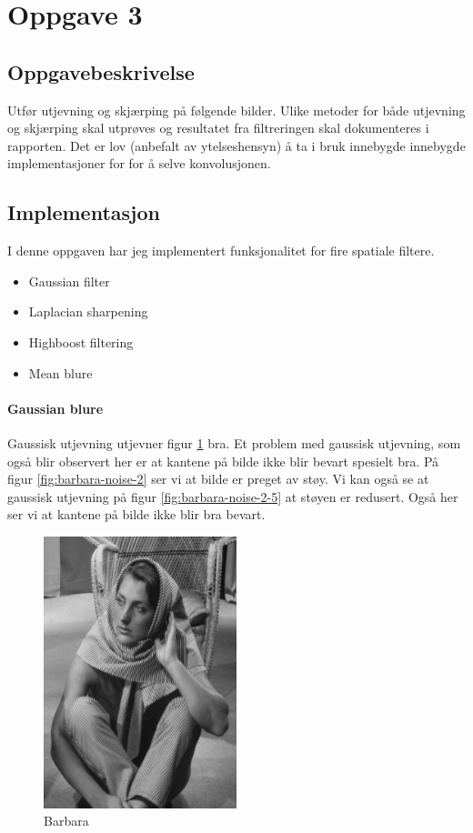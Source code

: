 \documentclass[a4paper, 12pt]{article}
\begin{document}
\section{Oppgave 3}
\subsection{Oppgavebeskrivelse}
Utfør utjevning og skjærping på følgende bilder. Ulike metoder for både utjevning og skjærping skal utprøves og resultatet fra filtreringen skal dokumenteres i rapporten. Det er lov (anbefalt av ytelseshensyn) å ta i bruk innebygde innebygde implementasjoner for for å selve konvolusjonen.

\subsection{Implementasjon}
I denne oppgaven har jeg implementert funksjonalitet for fire spatiale filtere.
\begin{itemize}
\item Gaussian filter
\item Laplacian sharpening
\item Highboost filtering
\item Mean blure
\end{itemize}

\paragraph{Gaussian blure}
Gaussisk utjevning utjevner figur \ref{fig:barbara} bra. Et problem med gaussisk utjevning, som også blir observert her er at kantene på bilde ikke blir bevart spesielt bra.
På figur \ref{fig:barbara-noise-2} ser vi at bilde er preget av støy. Vi kan også se at gaussisk utjevning på figur \ref{fig:barbara-noise-2-5} at støyen er redusert. Også her ser vi at kantene på bilde ikke blir bra bevart.
\begin{figure}[h]
  \centering
  \includegraphics[width=0.5\textwidth]{images/barbara}
  \caption{Barbara}
  \label{fig:barbara}
\end{figure}
\end{document}
